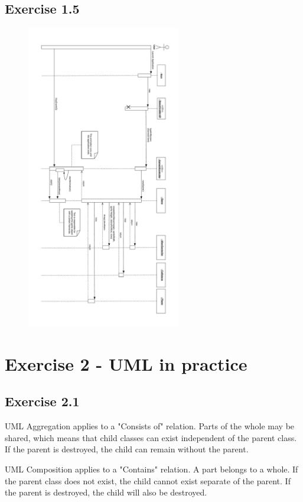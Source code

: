 \documentclass[10pt]{article}
\begin{document}
 \subsection*{Exercise 1.5} 
\begin{figure}[ht!]
\centering
\includegraphics[width=0.6\textwidth]{SI-Sequence.pdf}
\end{figure}
\pagebreak

\section{Exercise 2 - UML in practice}
\subsection{Exercise 2.1}
UML Aggregation applies to a "Consists of" relation.
Parts of the whole may be shared, which means that child classes can exist independent of the parent class.
If the parent is destroyed, the child can remain without the parent.

UML Composition applies to a "Contains" relation.
A part belongs to a whole. If the parent class does not exist, the child cannot exist separate of the parent. 
If the parent is destroyed, the child will also be destroyed.
\end{document}
